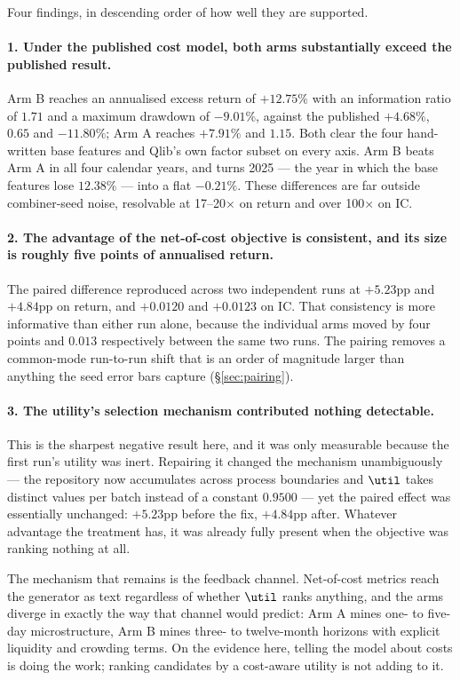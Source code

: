 Four findings, in descending order of how well they are supported.

\paragraph{1. Under the published cost model, both arms substantially exceed the
published result.} Arm B reaches an annualised excess return of $+12.75\%$ with
an information ratio of $1.71$ and a maximum drawdown of $-9.01\%$, against the
published $+4.68\%$, $0.65$ and $-11.80\%$; Arm A reaches $+7.91\%$ and $1.15$.
Both clear the four hand-written base features and Qlib's own factor subset on
every axis. Arm B beats Arm A in all four calendar years, and turns 2025 --- the
year in which the base features lose $12.38\%$ --- into a flat $-0.21\%$. These
differences are far outside combiner-seed noise, resolvable at 17--20$\times$
on return and over 100$\times$ on IC.

\paragraph{2. The advantage of the net-of-cost objective is consistent, and its
size is roughly five points of annualised return.} The paired difference
reproduced across two independent runs at $+5.23$pp and $+4.84$pp on return, and
$+0.0120$ and $+0.0123$ on IC. That consistency is more informative than either
run alone, because the individual arms moved by four points and $0.013$
respectively between the same two runs. The pairing removes a common-mode
run-to-run shift that is an order of magnitude larger than anything the seed
error bars capture (\S\ref{sec:pairing}).

\paragraph{3. The utility's selection mechanism contributed nothing detectable.}
This is the sharpest negative result here, and it was only measurable because the
first run's utility was inert. Repairing it changed the mechanism unambiguously
--- the repository now accumulates across process boundaries and $\util$ takes
distinct values per batch instead of a constant $0.9500$ --- yet the paired
effect was essentially unchanged: $+5.23$pp before the fix, $+4.84$pp after.
Whatever advantage the treatment has, it was already fully present when the
objective was ranking nothing at all.

The mechanism that remains is the feedback channel. Net-of-cost metrics reach the
generator as text regardless of whether $\util$ ranks anything, and the arms
diverge in exactly the way that channel would predict: Arm A mines one- to
five-day microstructure, Arm B mines three- to twelve-month horizons with
explicit liquidity and crowding terms. On the evidence here, telling the model
about costs is doing the work; ranking candidates by a cost-aware utility is not
adding to it.

